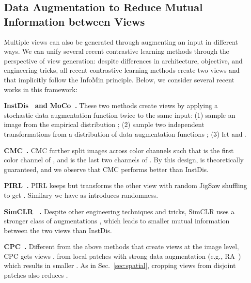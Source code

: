 \documentclass{article}
\begin{document}
\subsection{Data Augmentation to Reduce Mutual Information between Views}

Multiple views can also be generated through augmenting an input in different ways. We can unify several recent contrastive learning methods through the perspective of view generation: despite differences in architecture, objective, and engineering tricks, all recent contrastive learning methods create two views  and  that implicitly follow the InfoMin principle. Below, we consider several recent works in this framework:


\textbf{InstDis~\cite{wu2018unsupervised} and MoCo~\cite{he2019momentum}.} These two methods create views by applying a stochastic data augmentation function twice to the same input: (1) sample an image  from the empirical distribution ; (2) sample two independent transformations  from a distribution of data augmentation functions ; (3) let  and .

\textbf{CMC~\cite{tian2019contrastive}.} CMC further split images across color channels such that  is the first color channel of , and  is the last two channels of . By this design,  is theoretically guaranteed, and we observe that CMC performs better than InstDis.

\textbf{PIRL~\cite{misra2019self}.} PIRL keeps  but transforms the other view  with random JigSaw shuffling  to get . Similary we have  as  introduces randomness.

\textbf{SimCLR ~\cite{chen2020simple}.} Despite other engineering techniques and tricks, SimCLR uses a stronger class of augmentations , which leads to smaller mutual information between the two views than InstDis.

\textbf{CPC~\cite{oord2018representation}.} Different from the above methods that create views at the image level, CPC gets views ,  from local patches with strong data augmentation (e.g., RA~\cite{cubuk2019randaugment}) which results in smaller . As in Sec.~\ref{sec:spatial}, cropping views from disjoint patches also reduces .
\end{document}

